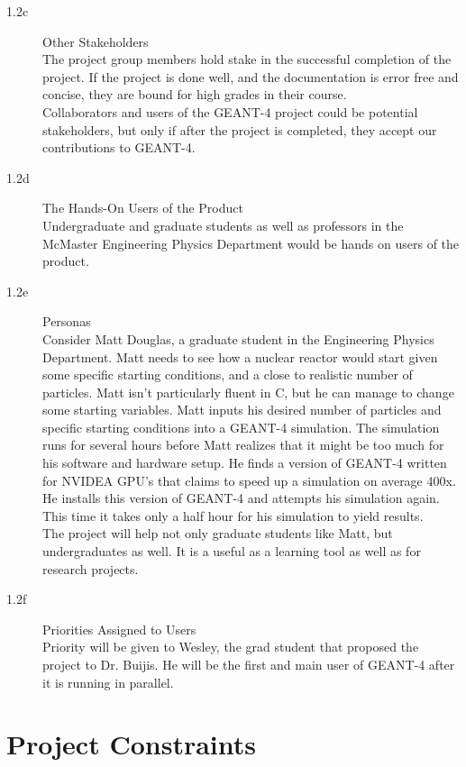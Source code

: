 \documentclass[12pt]{article}
\begin{document}
\begin{description}
\begin{description}
  \item[1.2c] Other Stakeholders \\
	The project group members hold stake in the successful completion of the project. If the project is done well, and the 				documentation is error free and concise, they are bound for high grades in their course. \\
	Collaborators and users of the GEANT-4 project could be potential stakeholders, but only if after the project is completed, they 	accept our contributions to GEANT-4. \\
  \item[1.2d] The Hands-On Users of the Product \\
	Undergraduate and graduate students as well as professors in the McMaster Engineering Physics Department would be hands 			on users of the product. 
 \item[1.2e] Personas \\
	Consider Matt Douglas, a graduate student in the Engineering Physics Department. Matt needs to see how a nuclear reactor 			would start given some specific starting conditions, and a close to realistic number of particles. Matt isn't particularly fluent in 			C, but he can manage to change some starting variables. Matt inputs his desired number of particles and specific starting 			conditions into a GEANT-4 simulation. The simulation runs for several hours before Matt realizes that it might be too much for 			his software and hardware setup. He finds a version of GEANT-4 written for NVIDEA GPU's that claims to speed up a simulation 	on average 400x. He installs this version of GEANT-4 and attempts his simulation again. This time it takes only a half hour for 			his simulation to yield results. \\
	The project will help not only graduate students like Matt, but undergraduates as well. It is a useful as a learning tool as well as 	for research projects. \\
 \item[1.2f] Priorities Assigned to Users\\
	Priority will be given to Wesley, the grad student that proposed the project to Dr. Buijis. He will be the first and main user of 			GEANT-4 after it is running in parallel. 
\end{description}
\end{description}


\section{Project Constraints}
\end{document}
